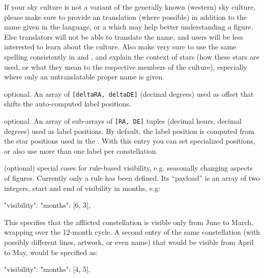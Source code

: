 \begin{description}
	If your sky culture is not a variant of the generally known  (western)
	sky culture, please make sure to provide an  translation (where possible) in addition to the name given in
	the  language, or a  which may help better understanding a figure. Else translators will not be able to translate
	the name, and users will be less interested to learn about the culture. 
	Also make very sure to use the same spelling consistently in  and , 
	and explain the context of stars (how these stars are used, or what they mean to the respective members of the culture), 
	especially where only an untranslatable proper name is given.

\item[\jtag{label\_offset}] optional. An array of \texttt{[deltaRA, deltaDE]} (decimal degrees)
                            used as offset that shifts the auto-computed label positions. 

\item[\jtag{label\_positions}] optional. An array of sub-arrays of \texttt{[RA, DE]} tuples (decimal hours, decimal degrees) used as label positions. 
                               By default, the label position is computed from the star positions used in the . 
			                   With this entry you can set specialized positions, or also use more than one label per constellation. 
\item[\jtag{visibility}] (optional) special cases for rule-based visibility, e.g. seasonally changing aspects of figures. 
	Currently only a  rule has been defined. 
	Its ``payload'' is an array of two integers, start and end of visibility in months, e.g:

	\begin{jsonfile}
"visibility": {"months": [6, 3]},
	\end{jsonfile}
%
This specifies that the afflicted constellation is visible only from June to March, wrapping over the 12-month cycle. 
A second entry of the same constellation (with possibly different lines, artwork, or even name) 
that would be visible from April to May, would be specified as:
\begin{jsonfile}
"visibility": {"months": [4, 5]},
\end{jsonfile}
\end{description}


